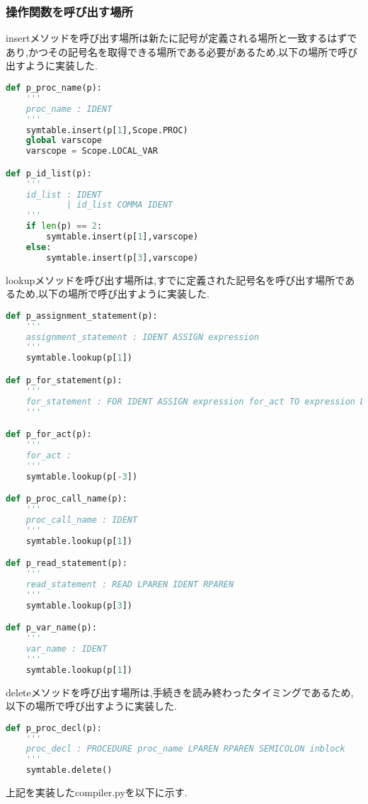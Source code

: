 \documentclass[main]{subfiles}
\begin{document}
\subsubsection{操作関数を呼び出す場所}
insertメソッドを呼び出す場所は新たに記号が定義される場所と一致するはずであり,かつその記号名を取得できる場所である必要があるため,以下の場所で呼び出すように実装した.
\begin{lstlisting}[caption=insertメソッドを呼び出す場所,language=Python]
def p_proc_name(p):
    '''
    proc_name : IDENT
    '''
    symtable.insert(p[1],Scope.PROC)
    global varscope
    varscope = Scope.LOCAL_VAR

def p_id_list(p):
    '''
    id_list : IDENT
            | id_list COMMA IDENT
    '''
    if len(p) == 2:
        symtable.insert(p[1],varscope)
    else:
        symtable.insert(p[3],varscope)
\end{lstlisting}
lookupメソッドを呼び出す場所は,すでに定義された記号名を呼び出す場所であるため,以下の場所で呼び出すように実装した.
\begin{lstlisting}[caption=lookupメソッドを呼び出す場所,language=Python]
def p_assignment_statement(p):
    '''
    assignment_statement : IDENT ASSIGN expression
    '''
    symtable.lookup(p[1])

def p_for_statement(p):
    '''
    for_statement : FOR IDENT ASSIGN expression for_act TO expression DO statement
    '''

def p_for_act(p):
    '''
    for_act : 
    '''
    symtable.lookup(p[-3])

def p_proc_call_name(p):
    '''
    proc_call_name : IDENT
    '''
    symtable.lookup(p[1])

def p_read_statement(p):
    '''
    read_statement : READ LPAREN IDENT RPAREN
    '''
    symtable.lookup(p[3])

def p_var_name(p):
    '''
    var_name : IDENT
    '''
    symtable.lookup(p[1])
\end{lstlisting}
deleteメソッドを呼び出す場所は,手続きを読み終わったタイミングであるため,以下の場所で呼び出すように実装した.
\begin{lstlisting}[caption=deleteメソッドを呼び出す場所,language=Python]
def p_proc_decl(p):
    '''
    proc_decl : PROCEDURE proc_name LPAREN RPAREN SEMICOLON inblock
    '''
    symtable.delete()
\end{lstlisting}

上記を実装したcompiler.pyを以下に示す.

\end{document}
